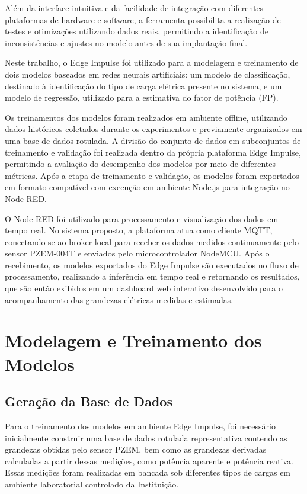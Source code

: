 Além da interface intuitiva e da facilidade de integração com diferentes plataformas de hardware e software, a ferramenta possibilita a realização de testes e otimizações utilizando dados reais, permitindo a identificação de inconsistências e ajustes no modelo antes de sua implantação final.

Neste trabalho, o Edge Impulse foi utilizado para a modelagem e treinamento de dois modelos baseados em redes neurais artificiais: um modelo de classificação, destinado à identificação do tipo de carga elétrica presente no sistema, e um modelo de regressão, utilizado para a estimativa do fator de potência (FP).

Os treinamentos dos modelos foram realizados em ambiente offline, utilizando dados históricos coletados durante os experimentos e previamente organizados em uma base de dados rotulada. A divisão do conjunto de dados em subconjuntos de treinamento e validação foi realizada dentro da própria plataforma Edge Impulse, permitindo a avaliação do desempenho dos modelos por meio de diferentes métricas. Após a etapa de treinamento e validação, os modelos foram exportados em formato compatível com execução em ambiente Node.js para integração no Node-RED.

O Node-RED foi utilizado para processamento e visualização dos dados em tempo real. No sistema proposto, a plataforma atua como cliente MQTT, conectando-se ao broker local para receber os dados medidos continuamente pelo sensor PZEM-004T e enviados pelo microcontrolador NodeMCU. Após o recebimento, os modelos exportados do Edge Impulse são executados no fluxo de processamento, realizando a inferência em tempo real e retornando os resultados, que são então exibidos em um dashboard web interativo desenvolvido para o acompanhamento das grandezas elétricas medidas e estimadas.

\section{Modelagem e Treinamento dos Modelos}
\subsection{Geração da Base de Dados}
Para o treinamento dos modelos em ambiente Edge Impulse, foi necessário inicialmente construir uma base de dados rotulada representativa contendo as grandezas obtidas pelo sensor PZEM, bem como as grandezas derivadas calculadas a partir dessas medições, como potência aparente e potência reativa. Essas medições foram realizadas em bancada sob diferentes tipos de cargas em ambiente laboratorial controlado da Instituição.


